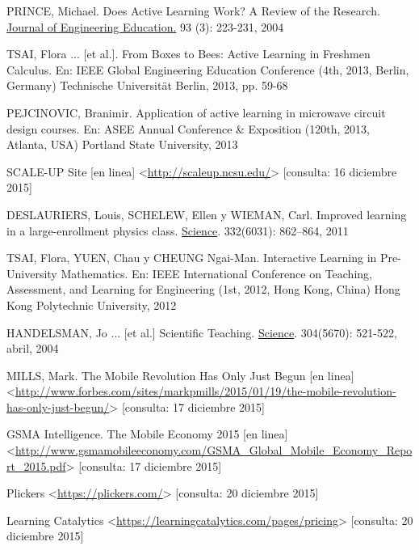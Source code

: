 

\begin{thebibliography}{9}

    PRINCE, Michael.
    Does Active Learning Work? A Review of the Research.
    \uline{Journal of Engineering Education.}
    93 (3): 223-231, 2004

    TSAI, Flora ... [et al.].
    From Boxes to Bees:
        Active Learning in Freshmen Calculus.
    En: IEEE Global Engineering Education Conference
    (4th, 2013, Berlin, Germany)
    Technische Universität Berlin,
    2013,
    pp. 59-68

    PEJCINOVIC, Branimir.
    Application of active learning in microwave circuit
        design courses.
    En: ASEE Annual Conference \& Exposition
    (120th, 2013, Atlanta, USA)
    Portland State University,
    2013

    SCALE-UP Site [en linea]
    <\url{http://scaleup.ncsu.edu/}>
    [consulta: 16 diciembre 2015]

    DESLAURIERS, Louis, SCHELEW, Ellen y WIEMAN, Carl.
    Improved learning in a large-enrollment physics class.
    \uline{Science}.
    332(6031): 862–864,
    2011

    TSAI, Flora, YUEN, Chau y CHEUNG Ngai-Man.
    Interactive Learning in Pre-University Mathematics.
    En: IEEE International Conference on Teaching,
        Assessment, and Learning for Engineering
    (1st, 2012, Hong Kong, China)
    Hong Kong Polytechnic University,
    2012

    HANDELSMAN, Jo ... [et al.]
    Scientific Teaching.
    \uline{Science}.
    304(5670): 521-522,
    abril, 2004

    MILLS, Mark.
    The Mobile Revolution Has Only Just Begun [en linea] \\
    <\url{http://www.forbes.com/sites/markpmills/2015/01/19/the-mobile-revolution-has-only-just-begun/}>
    [consulta: 17 diciembre 2015]

    GSMA Intelligence.
    The Mobile Economy 2015 [en linea] \\
    <\url{http://www.gsmamobileeconomy.com/GSMA_Global_Mobile_Economy_Report_2015.pdf}>
    [consulta: 17 diciembre 2015]

    Plickers
    <\url{https://plickers.com/}>
    [consulta: 20 diciembre 2015]

    Learning Catalytics
    <\url{https://learningcatalytics.com/pages/pricing}>
    [consulta: 20 diciembre 2015]


\end{thebibliography}
